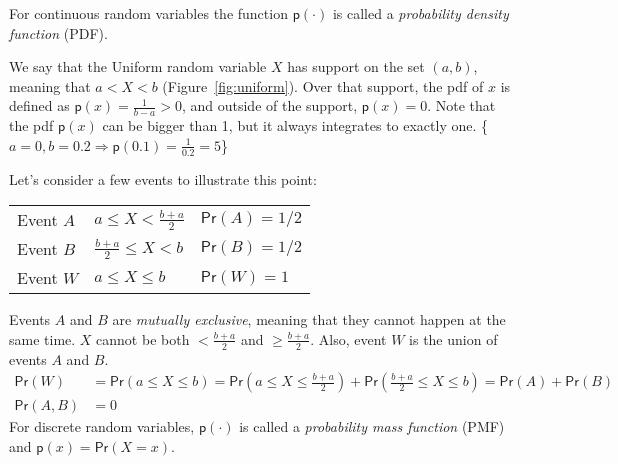 \documentclass[twoside]{article}
\def\ind{1\hspace{-0.033 in}\textnormal{l}} %
\def\Pr{\textsf{Pr}} %
\def\p{\textsf{p}} %
\def\tn#1{\textnormal{#1}} %
\begin{document}
For continuous random variables the function $\p(\cdot)$ is called a \emph{probability density function} (PDF). %

We say that the Uniform random variable $X$ has support on the set $(a,b)$, meaning that $ a < X < b$ (Figure~\ref{fig:uniform}). Over that support, the pdf of $x$ is defined as $\p(x)= \frac{1}{b-a}>0$, and outside of the support, $\p(x)= 0$. Note that the pdf $\p(x)$ can be bigger than 1, but it always integrates to exactly one. \{$a=0,b=0.2 \Rightarrow \p(0.1) = \frac{1}{0.2} = 5$\} 

Let's consider a few events to illustrate this point:

\begin{tabular}{lll}
Event $A$ & $a \leq X < \frac{b+a}{2}$	& $\Pr(A) = 1/2$\\
Event $B$ & $\frac{b+a}{2} \leq X < b$	& $\Pr(B) = 1/2$\\
Event $W$ & $a \leq X \leq b$		& $\Pr(W) = 1$\\
\end{tabular}

Events $A$ and $B$ are \emph{mutually exclusive}, meaning that they cannot happen at the same time. $X$ cannot be both $< \frac{b+a}{2}$ and $ \geq \frac{b+a}{2}$. %
Also, event $W$ is the union of events $A$ and $B$.
\begin{align*}
 \Pr(W) & = \Pr(a \leq X \leq b) = \Pr\left(a \leq X \leq \frac{b+a}{2}\right) + \Pr\left(\frac{b+a}{2} \leq X \leq b\right) = \Pr(A) + \Pr(B)\\
 \Pr(A,B) & = 0  
\end{align*}
For discrete random variables, $\p(\cdot)$ is called a \emph{probability mass function} (PMF) and $\p(x)=\Pr(X=x)$.
\end{document}
